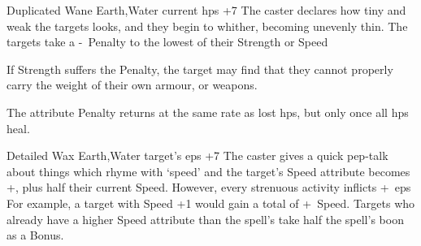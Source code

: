 \ifodd\value{diceNo}

  {Duplicated}%
  {Wane}%
  {Earth,Water}%
  {current \glspl{hp} +7}%
  {The caster declares how tiny and weak the targets looks, and they begin to whither, becoming unevenly thin.
    The targets take a -~Penalty to the lowest of their Strength or Speed}%
  {If Strength suffers the Penalty, the target may find that they cannot properly carry the weight of their own armour, or weapons.

    The \gls{attribute} Penalty returns at the same rate as lost \glspl{hp}, but only once all \glspl{hp} heal.}

\else

  {Detailed}%
  {Wax}%
  {Earth,Water}%
  {target's \glspl{ep} +7}%
  {The caster gives a quick pep-talk about things which rhyme with `speed' and the target's Speed \gls{attribute} becomes +, plus half their current Speed.
  However, every strenuous activity inflicts +~\glspl{ep}}%
  {
  	For example, a target with Speed +1 would gain a total of +~Speed.
	Targets who already have a higher Speed \gls{attribute} than the spell's take half the spell's boon as a Bonus.
  }

\fi
{}
